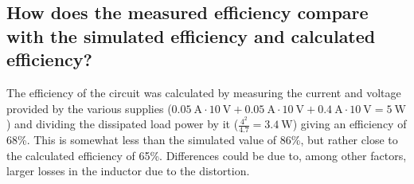 \subsection{How does the measured efficiency compare with the simulated efficiency and calculated efficiency?}
The efficiency of the circuit was calculated by measuring the current and voltage provided by the various supplies ($\SI{0.05}{\ampere}\cdot\SI{10}{\volt}+\SI{0.05}{\ampere}\cdot\SI{10}{\volt}+\SI{0.4}{\ampere}\cdot\SI{10}{\volt}=\SI{5}{\watt}$) and dividing the dissipated load power by it ($\frac{4^2}{4.7}=\SI{3.4}{\watt}$) giving an efficiency of 68\%. This is somewhat less than the simulated value of 86\%, but rather close to the calculated efficiency of 65\%. Differences could be due to, among other factors, larger losses in the inductor due to the distortion.
